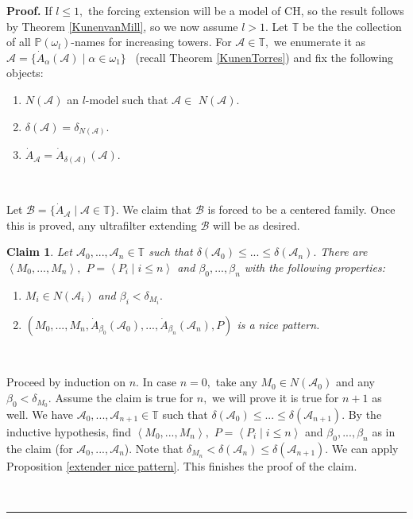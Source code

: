 \documentclass{article}%
\newtheorem{claim}[theorem]{Claim}
\newenvironment{proof}[1][Proof]{\noindent\textbf{#1.} }{\ \rule{0.5em}{0.5em}}
\begin{document}
\begin{proof}
If $l\leq1,$ the forcing extension will be a model of \textsf{CH, }so the
result follows by Theorem \ref{KunenvanMill}, so we now assume $l>1.$ Let
$\mathbb{T}$ be the the collection of all $\mathbb{P}\left(  \omega
_{l}\right)  $-names for increasing towers. For $\mathcal{A}\in\mathbb{T},$ we
enumerate it as $\mathcal{A=\{}\dot{A}_{\alpha}(\mathcal{A})\mid\alpha
\in\omega_{1}\mathcal{\}}$ \ (recall Theorem \ref{KunenTorres}) and fix the
following objects:

\begin{enumerate}
\item $N(\mathcal{A})$ an $l$-model such that $\mathcal{A\in}$ $N\left(
\mathcal{A}\right)  .$

\item $\delta\left(  \mathcal{A}\right)  =\delta_{N\left(  \mathcal{A}\right)
}.$

\item $\dot{A}_{\mathcal{A}}=\dot{A}\mathcal{_{\delta\left(  \mathcal{A}%
\right)  }(\mathcal{A})}.$
\end{enumerate}

\qquad\ \qquad\ \ 

Let $\mathcal{B=\{}\dot{A}\mathcal{_{\mathcal{A}}\mid A}\in\mathbb{T}%
\mathcal{\}}.$ We claim that $\mathcal{B}$ is forced to be a centered family.
Once this is proved, any ultrafilter extending $\mathcal{B}$ will be as desired.

\begin{claim}
Let $\mathcal{A}_{0},...,\mathcal{A}_{n}\in\mathbb{T}$ such that
$\delta(\mathcal{A}_{0})\leq...\leq\delta(\mathcal{A}_{n}).$ There
are\newline$\left\langle M_{0},...,M_{n}\right\rangle ,$ $P=\left\langle
P_{i}\mid i\leq n\right\rangle $ and $\beta_{0},...,\beta_{n}$ with the
following properties:

\begin{enumerate}
\item $M_{i}\in N(\mathcal{A}_{i})$ and $\beta_{i}<\delta_{M_{i}}.$

\item $(M_{0},...,M_{n},\dot{A}_{\beta_{0}}(\mathcal{A}_{0}),...,\dot
{A}_{\beta_{n}}(\mathcal{A}_{n}),P)$ is a nice pattern.
\end{enumerate}
\end{claim}

\qquad\ \qquad\ 

Proceed by induction on $n.$ In case $n=0,$ take any $M_{0}\in N(\mathcal{A}%
_{0})$ and any $\beta_{0}<\delta_{M_{0}}.$ Assume the claim is true for $n,$
we will prove it is true for $n+1$ as well. We have $\mathcal{A}%
_{0},...,\mathcal{A}_{n+1}\in\mathbb{T}$ such that $\delta(\mathcal{A}%
_{0})\leq...\leq\delta(\mathcal{A}_{n+1}).$ By the inductive hypothesis, find
$\left\langle M_{0},...,M_{n}\right\rangle ,$ $P=\left\langle P_{i}\mid i\leq
n\right\rangle $ and $\beta_{0},...,\beta_{n}$ as in the claim (for
$\mathcal{A}_{0},...,\mathcal{A}_{n}$). Note that $\delta_{M_{n}}%
<\delta(\mathcal{A}_{n})\leq\delta(\mathcal{A}_{n+1}).$ We can apply
Proposition \ref{extender nice pattern}. This finishes the proof of the claim.


\end{proof}
\end{document}
